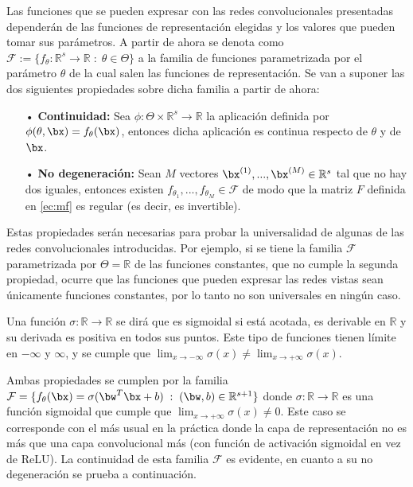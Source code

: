 Las funciones que se pueden expresar con las redes convolucionales presentadas dependerán de las funciones de representación elegidas y los valores que pueden tomar sus parámetros. A partir de ahora se denota como $\mathcal{F} := \{f_\theta:\mathbb{R}^s\rightarrow\mathbb{R}\; : \; \theta\in\Theta\}$ a la familia de funciones  parametrizada por el parámetro $\theta$ de la cual salen las funciones de representación. Se van a suponer las dos siguientes propiedades sobre dicha familia a partir de ahora:

\begin{itemize}
\item[•] \textbf{Continuidad:} Sea $\phi:\Theta \times \mathbb{R}^s \rightarrow \mathbb{R}$ la aplicación definida por $\phi(\theta,\bx)=f_\theta(\bx)$, entonces dicha aplicación es continua respecto de $\theta$ y de $\bx$.
\item[•] \textbf{No degeneración:} Sean $M$ vectores $\bx^{(1)},... ,\bx^{(M)}\in \mathbb{R}^s$ tal que no hay dos iguales, entonces existen $f_{\theta_1},... ,f_{\theta_M}\in \mathcal{F}$ de modo que la matriz $F$ definida  en \eqref{ec:mf} es regular (es decir, es invertible).
\end{itemize}

Estas propiedades serán necesarias para probar la universalidad de algunas de las redes convolucionales introducidas. Por ejemplo, si se tiene la familia $\mathcal{F}$ parametrizada por $\Theta=\mathbb{R}$ de las funciones constantes, que no cumple la segunda propiedad, ocurre que las funciones que pueden expresar las redes vistas sean únicamente funciones constantes, por lo tanto no son universales en ningún caso.

\begin{definicion}
Una función $\sigma:\mathbb{R}\rightarrow \mathbb{R}$ se dirá que es sigmoidal si está acotada, es derivable en $\mathbb{R}$ y su derivada es positiva en todos sus puntos. Este tipo de funciones tienen límite en $-\infty$ y $\infty$, y se cumple que $\lim_{x \to -\infty} \sigma(x)\neq \lim_{x \to +\infty} \sigma(x)$.
\end{definicion}

Ambas propiedades se cumplen por la familia $\mathcal{F} =  \{f_\theta(\bx) = \sigma (\bw^T\bx + b) \; : \; (\bw,b)\in\mathbb{R}^{s+1} \}$ donde $\sigma:\mathbb{R}\rightarrow\mathbb{R}$ es una función sigmoidal que cumple que $\lim_{x \to +\infty} \sigma(x) \neq 0$. Este caso se corresponde con el más usual en la práctica donde la capa de representación no es más que una capa convolucional más (con función de activación sigmoidal en vez de ReLU). La continuidad de esta familia $\mathcal{F}$ es evidente, en cuanto a su no degeneración se prueba a continuación.

